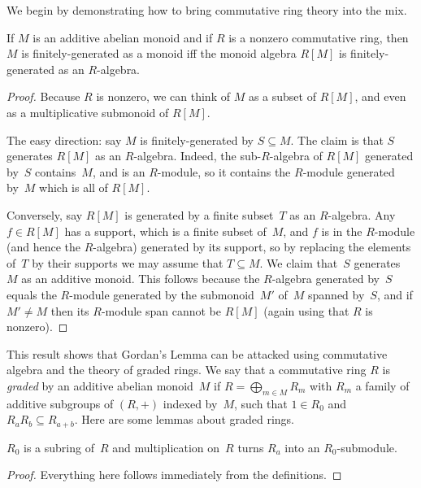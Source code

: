 We begin by demonstrating how to bring commutative ring theory into the mix.

\begin{lemma} If $M$ is an additive abelian monoid and if $R$ is a nonzero commutative ring, then $M$ is finitely-generated as a monoid iff the monoid algebra $R[M]$ is finitely-generated as an $R$-algebra.
\end{lemma}
\begin{proof} Because $R$ is nonzero, we can think of $M$ as a subset of $R[M]$, and even as a multiplicative submonoid of $R[M]$.

  The easy direction: say $M$ is finitely-generated by $S\subseteq M$. The claim is that $S$ generates $R[M]$ as an $R$-algebra. Indeed, the sub-$R$-algebra of $R[M]$ generated by~$S$ contains~$M$, and is an $R$-module, so it contains the $R$-module generated by~$M$ which is all of $R[M]$.

  Conversely, say $R[M]$ is generated by a finite subset~$T$ as an $R$-algebra. Any $f\in R[M]$ has a support, which is a finite subset of~$M$, and $f$ is in the $R$-module (and hence the $R$-algebra) generated by its support, so by replacing the elements of~$T$ by their supports we may assume that $T\subseteq M$. We claim that~$S$ generates~$M$ as an additive monoid. This follows because the $R$-algebra generated by~$S$ equals the $R$-module generated by the submonoid~$M'$ of~$M$ spanned by~$S$, and if $M'\not=M$ then its $R$-module span cannot be $R[M]$ (again using that $R$ is nonzero).
\end{proof}

This result shows that Gordan's Lemma can be attacked using commutative algebra and the theory of graded rings. We say that a commutative ring $R$ is \emph{graded} by an additive abelian monoid~$M$ if $R=\bigoplus_{m\in M} R_m$ with $R_m$ a family of additive subgroups of $(R,+)$ indexed by~$M$, such that $1\in R_0$ and $R_{a}R_b\subseteq R_{a+b}$. Here are some lemmas about graded rings.

\begin{lemma} $R_0$ is a subring of~$R$ and multiplication on~$R$ turns $R_a$ into an $R_0$-submodule.
\end{lemma}
\begin{proof} Everything here follows immediately from the definitions.
\end{proof}

